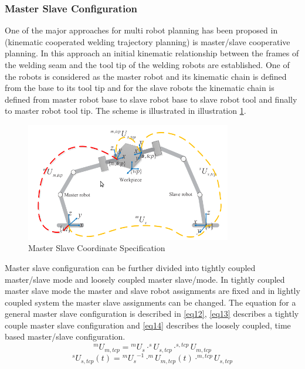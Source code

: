  
\subsubsection{Master Slave Configuration}
One of the major approaches for multi robot planning has been proposed in \cite{7}(kinematic cooperated welding trajectory planning) is master/slave cooperative planning. In this approach an initial kinematic relationship between the frames of the welding seam and the tool tip of the welding robots are established. One of the robots is considered as the master robot and its kinematic chain is defined from the base to its tool tip and for the slave robots the kinematic chain is defined from master robot base to slave robot base to slave robot tool and finally to master robot tool tip. The scheme is illustrated in illustration \ref{fig:img5}.
\begin{figure}[htbp] %
 \centering
   \includegraphics[width=9cm]{images/master_slave_coord.png}
   \caption[Master Slave Coordinate Specification]
   {Master Slave Coordinate Specification \footnotemark[\value{footnote}]}  
\label{fig:img5}
\end{figure}
Master slave configuration can be further divided into tightly coupled master/slave mode and loosely coupled master slave/mode. In tightly coupled master slave mode the master and slave robot assignments are fixed and in lightly coupled system the master slave assignments can be changed. 
The equation for a general master slave configuration is described in \eqref{eq12}, \eqref{eq13} describes a tightly couple master slave configuration and \eqref{eq14} describes the loosely coupled, time based master/slave configuration.
\begin{equation}
\label{eq12}
^{m}U_{m,tcp} = {^{m}U_{s}} \cdot ^{s}U_{s,tcp}\cdot^{s,tcp}U_{m,tcp}
\end{equation}
\begin{equation}
\label{eq13}
^{s}U_{s,tcp}(t) = {^{m}U_{s}}^{-1} \cdot ^{m}U_{m,tcp}(t)\cdot^{m,tcp}U_{s,tcp}
\end{equation}

